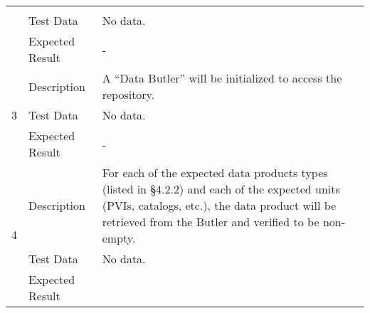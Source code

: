 \begin{longtable}[]{p{1.3cm}p{2cm}p{13cm}}
\begin{minipage}[t]{13cm}
{\vspace{\dp0}
} \end{minipage} \\ \cline{2-3}
& Test Data & 
\begin{minipage}[t]{13cm}{\footnotesize

No data. 
\vspace{\dp0}

} \end{minipage} \\ \cline{2-3}
& Expected Result &

\begin{minipage}[t]{13cm}{\footnotesize
-
\vspace{\dp0}
} \end{minipage} 


\\ \midrule



\multirow{3}{*}{ 3 } & Description &
\begin{minipage}[t]{13cm}{\footnotesize
A ``Data Butler'' will be initialized to access the repository.
 
\vspace{\dp0}
} \end{minipage} \\ \cline{2-3}
& Test Data & 
\begin{minipage}[t]{13cm}{\footnotesize

No data. 
\vspace{\dp0}

} \end{minipage} \\ \cline{2-3}
& Expected Result &

\begin{minipage}[t]{13cm}{\footnotesize
-
\vspace{\dp0}
} \end{minipage} 


\\ \midrule



\multirow{3}{*}{ 4 } & Description &
\begin{minipage}[t]{13cm}{\footnotesize
For each of the expected data products types (listed in §4.2.2) and each
of the expected units (PVIs, catalogs, etc.), the data product will be
retrieved from the Butler and verified to be non-empty.
 
\vspace{\dp0}
} \end{minipage} \\ \cline{2-3}
& Test Data & 
\begin{minipage}[t]{13cm}{\footnotesize

No data. 
\vspace{\dp0}

} \end{minipage} \\ \cline{2-3}
& Expected Result &


\end{longtable}
